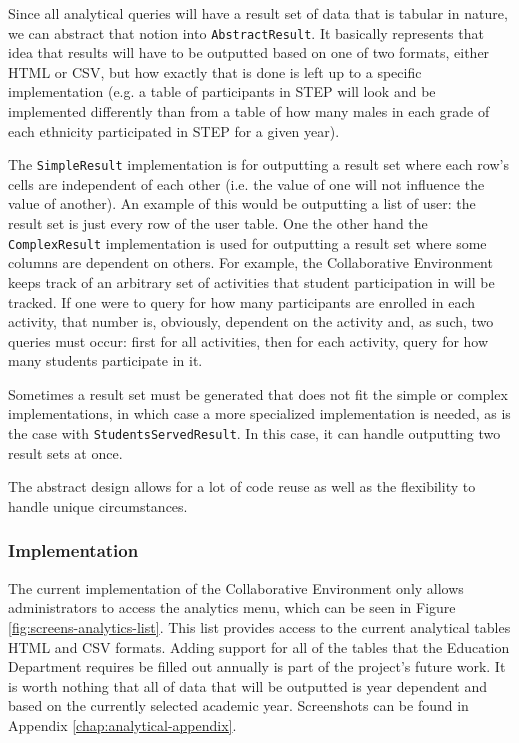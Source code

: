 Since all analytical queries will have a result set of data that is tabular in nature, we can abstract that notion into \texttt{AbstractResult}. It basically represents that idea that results will have to be outputted based on one of two formats, either HTML or CSV, but how exactly that is done is left up to a specific implementation (e.g. a table of participants in STEP will look and be implemented differently than from a table of how many males in each grade of each ethnicity participated in STEP for a given year).

The \texttt{SimpleResult} implementation is for outputting a result set where each row's cells are independent of each other (i.e. the value of one will not influence the value of another). An example of this would be outputting a list of user: the result set is just every row of the user table. One the other hand the \texttt{ComplexResult} implementation is used for outputting a result set where some columns are dependent on others. For example, the Collaborative Environment keeps track of an arbitrary set of activities that student participation in will be tracked. If one were to query for how many participants are enrolled in each activity, that number is, obviously, dependent on the activity and, as such, two queries must occur: first for all activities, then for each activity, query for how many students participate in it.

Sometimes a result set must be generated that does not fit the simple or complex implementations, in which case a more specialized implementation is needed, as is the case with \texttt{StudentsServedResult}. In this case, it can handle outputting two result sets at once.

The abstract design allows for a lot of code reuse as well as the flexibility to handle unique circumstances.

\subsubsection{Implementation}
The current implementation of the Collaborative Environment only allows administrators to access the analytics menu, which can be seen in Figure \ref{fig:screens-analytics-list}. This list provides access to the current analytical tables HTML and CSV formats. Adding support for all of the tables that the Education Department requires be filled out annually is part of the project's future work. It is worth nothing that all of data that will be outputted is year dependent and based on the currently selected academic year. Screenshots can be found in Appendix \ref{chap:analytical-appendix}.

